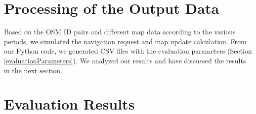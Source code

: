 \section{Processing of the Output Data}
Based on the OSM ID pairs and different map data according to the various periods, we simulated the navigation request and map update calculation. From our Python code, we generated CSV files with the evaluation parameters (Section \ref{evaluationParameters}). We analyzed our results and have discussed the results in the next section.  

\section{Evaluation Results}



